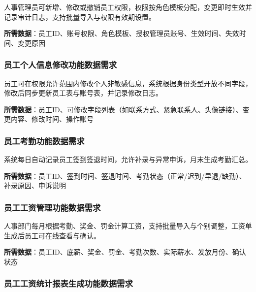 \documentclass[]{article}
\begin{document}
人事管理员可新增、修改或撤销员工权限，权限按角色模板分配，变更即时生效并记录审计日志，支持批量导入与权限有效期设置。

\textbf{所需数据}：员工ID、账号权限、角色模板、授权管理员账号、生效时间、失效时间、变更原因

\hypertarget{ux5458ux5de5ux4e2aux4ebaux4fe1ux606fux4feeux6539ux529fux80fdux6570ux636eux9700ux6c42}{%
\subsubsection{员工个人信息修改功能数据需求}\label{ux5458ux5de5ux4e2aux4ebaux4fe1ux606fux4feeux6539ux529fux80fdux6570ux636eux9700ux6c42}}

员工可在权限允许范围内修改个人非敏感信息，系统根据身份类型开放不同字段，修改后同步更新员工表与账号表，并记录修改日志。

\textbf{所需数据}：员工ID、可修改字段列表（如联系方式、紧急联系人、头像链接）、变更内容、修改时间、操作账号

\hypertarget{ux5458ux5de5ux8003ux52e4ux529fux80fdux6570ux636eux9700ux6c42}{%
\subsubsection{员工考勤功能数据需求}\label{ux5458ux5de5ux8003ux52e4ux529fux80fdux6570ux636eux9700ux6c42}}

系统每日自动记录员工签到签退时间，允许补录与异常申诉，月末生成考勤汇总。

\textbf{所需数据}：员工ID、签到时间、签退时间、考勤状态（正常/迟到/早退/缺勤）、补录原因、申诉说明

\hypertarget{ux5458ux5de5ux5de5ux8d44ux7ba1ux7406ux529fux80fdux6570ux636eux9700ux6c42}{%
\subsubsection{员工工资管理功能数据需求}\label{ux5458ux5de5ux5de5ux8d44ux7ba1ux7406ux529fux80fdux6570ux636eux9700ux6c42}}

人事部门每月根据考勤、奖金、罚金计算工资，支持批量导入与个别调整，工资单生成后员工可在线查看与确认。

\textbf{所需数据}：员工ID、底薪、奖金、罚金、考勤次数、实际薪水、发放月份、确认状态

\hypertarget{ux5458ux5de5ux5de5ux8d44ux7edfux8ba1ux62a5ux8868ux751fux6210ux529fux80fdux6570ux636eux9700ux6c42}{%
\subsubsection{员工工资统计报表生成功能数据需求}\label{ux5458ux5de5ux5de5ux8d44ux7edfux8ba1ux62a5ux8868ux751fux6210ux529fux80fdux6570ux636eux9700ux6c42}}
\end{document}

